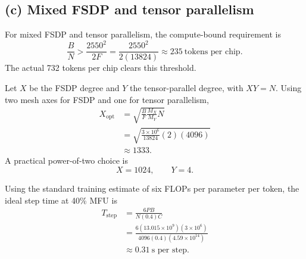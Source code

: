 \documentclass[11pt]{article}
\begin{document}
\subsection*{(c) Mixed FSDP and tensor parallelism}

For mixed FSDP and tensor parallelism, the compute-bound requirement is
\[
\frac{B}{N}>
\frac{2550^2}{2F}
=\frac{2550^2}{2(13824)}
\approx235\ \text{tokens per chip}.
\]
The actual 732 tokens per chip clears this threshold.

Let $X$ be the FSDP degree and $Y$ the tensor-parallel degree, with $XY=N$.
Using two mesh axes for FSDP and one for tensor parallelism,
\begin{align*}
X_{\mathrm{opt}}
&=\sqrt{\frac{B}{F}\frac{M_X}{M_Y}N}\\
&=\sqrt{\frac{3\times10^6}{13824}(2)(4096)}\\
&\approx1333.
\end{align*}
A practical power-of-two choice is
\[
\boxed{X=1024,\qquad Y=4}.
\]

Using the standard training estimate of six FLOPs per parameter per token,
the ideal step time at 40\% MFU is
\begin{align*}
T_{\mathrm{step}}
&=\frac{6PB}{N(0.4)C}\\
&=\frac{6(13.015\times10^9)(3\times10^6)}
{4096(0.4)(4.59\times10^{14})}\\
&\approx\boxed{0.31\ \text{s per step}}.
\end{align*}
\end{document}
